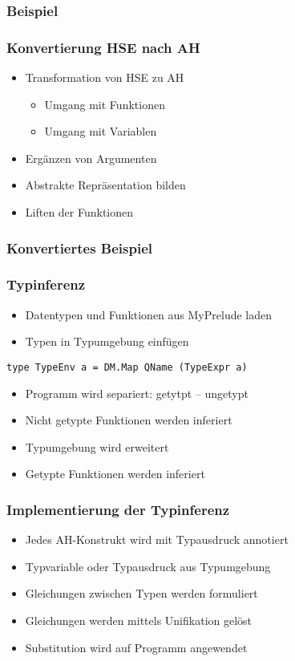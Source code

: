 \begin{frame}[fragile]
\frametitle{Beispiel}

\end{frame}

\begin{frame}
	\frametitle{Konvertierung HSE nach AH}
	\begin{itemize}
		\item Transformation von HSE zu AH
		  \begin{itemize}
		    \item Umgang mit Funktionen
		    \item Umgang mit Variablen
		  \end{itemize}
		\item Ergänzen von Argumenten
		\item Abstrakte Repräsentation bilden
		\item Liften der Funktionen
	\end{itemize}
\end{frame}

\begin{frame}[fragile]
\frametitle{Konvertiertes Beispiel}

\end{frame}

\begin{frame}[fragile]
  \frametitle{Typinferenz}
  \begin{itemize}
    \item Datentypen und Funktionen aus \glqq{}MyPrelude\grqq{} laden
    \item Typen in Typumgebung einfügen
  \end{itemize}
  \begin{lstlisting}
type TypeEnv a = DM.Map QName (TypeExpr a)
  \end{lstlisting}
  \begin{itemize}
    \item Programm wird separiert: getytpt -- ungetypt
    \item Nicht getypte Funktionen werden inferiert
    \item Typumgebung wird erweitert
    \item Getypte Funktionen werden inferiert
  \end{itemize}
\end{frame}

\begin{frame}
  \frametitle{Implementierung der Typinferenz}
  \begin{itemize}
    \item Jedes AH-Konstrukt wird mit Typausdruck annotiert
    \item Typvariable oder Typausdruck aus Typumgebung
    \item Gleichungen zwischen Typen werden formuliert
    \item Gleichungen werden mittels Unifikation gelöst
    \item Substitution wird auf Programm angewendet
  \end{itemize}
\end{frame}

